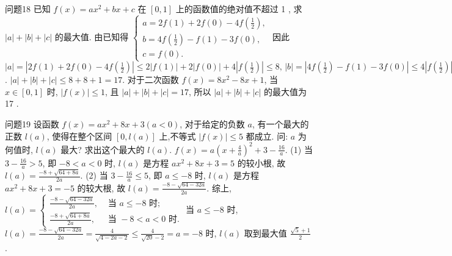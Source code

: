 问题18 已知 $f(x)=a x^2+b x+c$ 在 $[0,1]$ 上的函数值的绝对值不超过 1 , 求 $|a|+|b|+|c|$ 的最大值.
由已知得 $\left\{\begin{array}{l}a=2 f(1)+2 f(0)-4 f\left(\frac{1}{2}\right), \\ b=4 f\left(\frac{1}{2}\right)-f(1)-3 f(0), \\ c=f(0) .\end{array}\right.$ 因此 $|a|=|2 f(1)+ 2 f(0)-4 f\left(\frac{1}{2}\right)|\leqslant 2| f(1)|+2| f(0)|+4| f\left(\frac{1}{2}\right)|\leqslant 8,\, | b|=| 4 f\left(\frac{1}{2}\right)- f(1)-3 f(0)|\leqslant 4| f\left(\frac{1}{2}\right)|+| f(1)|+3| f(0)|\leqslant 8,\,|c|=| f(0)| \leqslant 1$. $|a|+|b|+|c| \leqslant 8+8+1=17$. 对于二次函数 $f(x)=8 x^2-8 x+1$, 当 $x \in[0,1]$ 时, $|f(x)| \leqslant 1$, 且 $|a|+|b|+|c|=17$, 所以 $|a|+|b|+|c|$ 的最大值为 17 .



问题19 设函数 $f(x)=a x^2+8 x+3(a<0)$, 对于给定的负数 $a$, 有一个最大的正数 $l(a)$, 使得在整个区间 $[0, l(a)]$ 上,不等式 $|f(x)| \leqslant 5$ 都成立.
问:
$a$ 为何值时, $l(a)$ 最大? 求出这个最大的 $l(a)$.
$f(x)=a\left(x+\frac{4}{a}\right)^2+3-\frac{16}{a}$.
 (1) 当 $3-\frac{16}{a}>5$, 即 $-8<a<0$ 时, $l(a)$ 是方程 $a x^2+8 x+3=5$ 的较小根, 故 $l(a)=\frac{-8+\sqrt{64+8 a}}{2 a}$.
(2) 当 $3-\frac{16}{a} \leqslant 5$, 即 $a \leqslant-8$ 时, $l(a)$ 是方程 $a x^2+8 x+3=-5$ 的较大根, 故 $l(a)=\frac{-8-\sqrt{64-32 a}}{2 a}$. 
综上, $l(a)= \begin{cases}\frac{-8-\sqrt{64-32 a}}{2 a}, & \text { 当 } a \leqslant-8 \text { 时; } \\ \frac{-8+\sqrt{64+8 a}}{2 a}, & \text { 当 }-8<a<0 \text { 时.
}\end{cases}$
当 $a \leqslant-8$ 时, $l(a)=\frac{-8-\sqrt{64-32 a}}{2 a}=\frac{4}{\sqrt{4-2 a-2}} \leqslant \frac{4}{\sqrt{20}-2}= a=-8$ 时, $l(a)$ 取到最大值 $\frac{\sqrt{5}+1}{2}$.



